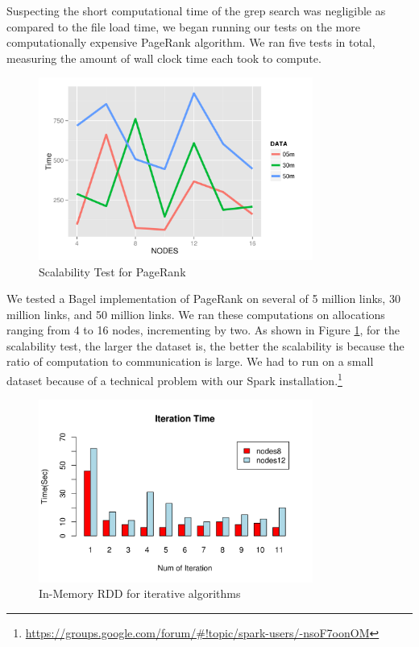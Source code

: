 \documentclass{article}
\begin{document}
Suspecting the short computational time of the grep search was negligible as
compared to the file load time, we began running our tests on the more
computationally expensive PageRank algorithm. We ran five tests in total,
measuring the amount of wall clock time each took to compute.

    \begin{figure}[H]
        \centering
        \includegraphics[width=90mm]{images/scalability.png}
        \caption{Scalability Test for PageRank}
        \label{fig:scalability}
    \end{figure}


We tested a Bagel implementation of PageRank on several of 5 million links, 30
million links, and 50 million links. We ran these computations on allocations
ranging from 4 to 16 nodes, incrementing by two.  As shown in Figure
\ref{fig:scalability}, for the scalability test, the larger the dataset is, the
better the scalability is because the ratio of computation to communication is
large. We had to run on a small dataset because of a technical problem with our
Spark installation.\footnote{
\url{https://groups.google.com/forum/#!topic/spark-users/-nsoF7oonOM}}

\begin{figure}[H]
        \centering
        \includegraphics[width=90mm]{images/in-mem.png}
        \caption{In-Memory RDD for iterative algorithms}
        \label{fig:in-memory}
    \end{figure}
\end{document}
